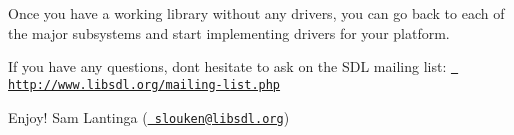 Once you have a working library without any drivers, you can go back to each of the major subsystems and start implementing drivers for your platform.

If you have any questions, don\textquotesingle{}t hesitate to ask on the SDL mailing list\+: \href{http://www.libsdl.org/mailing-list.php}{\texttt{ http\+://www.\+libsdl.\+org/mailing-\/list.\+php}}

Enjoy! Sam Lantinga (\href{mailto:slouken@libsdl.org}{\texttt{ slouken@libsdl.\+org}}) 